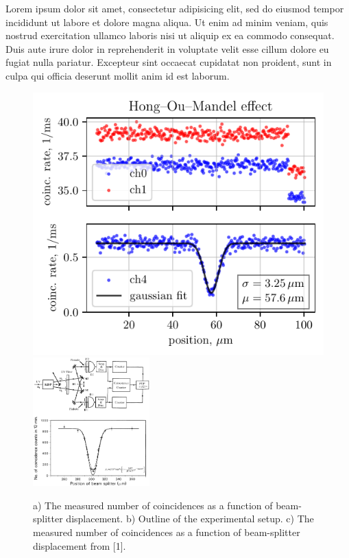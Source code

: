 Lorem ipsum dolor sit amet, consectetur adipisicing elit, sed do eiusmod
tempor incididunt ut labore et dolore magna aliqua. Ut enim ad minim veniam,
quis nostrud exercitation ullamco laboris nisi ut aliquip ex ea commodo
consequat. Duis aute irure dolor in reprehenderit in voluptate velit esse
cillum dolore eu fugiat nulla pariatur. Excepteur sint occaecat cupidatat non
proident, sunt in culpa qui officia deserunt mollit anim id est laborum.

\begin{figure}[h]
    \centering
    \includegraphics{../labs/1/hom_plot.pdf}
    \hspace{5 mm} 
    \includegraphics[width=0.4\textwidth]{../labs/1/hom_base.png}
    \caption{a) The measured number of coincidences as a function of beam-splitter displacement. b) Outline of the experimental setup. c) The measured number of coincidences as a function of beam-splitter displacement from [1].}
\end{figure}



